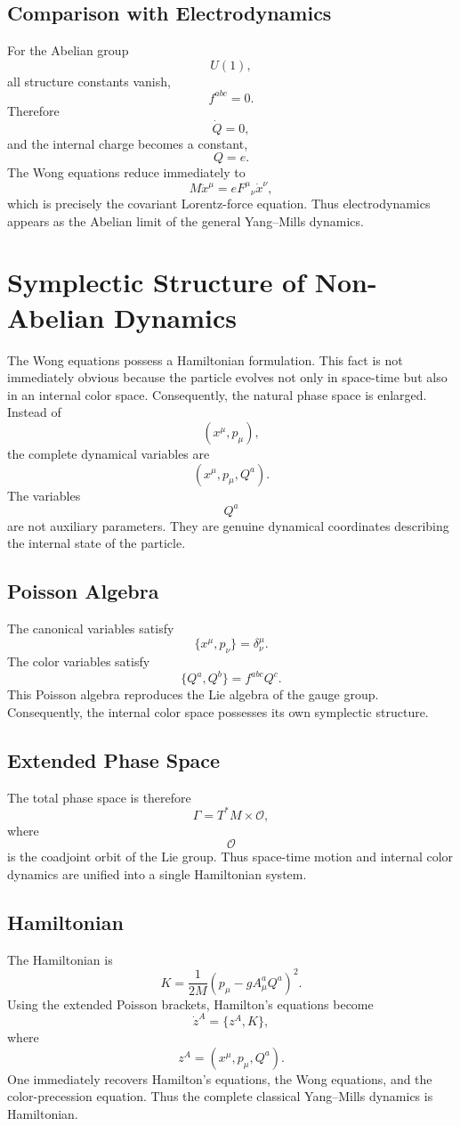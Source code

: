 \subsection{Comparison with Electrodynamics}
For the Abelian group
\[U(1),\]
all structure constants vanish,
\[f^{abc}=0.\]
Therefore
\[\dot Q=0,\]
and the internal charge becomes a constant,
\[Q=e.\]
The Wong equations reduce immediately to
\[M\ddot x^\mu=eF^{\mu}{}_{\nu}\dot x^\nu,\]
which is precisely the covariant Lorentz-force equation.
Thus electrodynamics appears as the Abelian limit of the general
Yang--Mills dynamics.
\section{Symplectic Structure of Non-Abelian Dynamics}
The Wong equations possess a Hamiltonian formulation.
This fact is not immediately obvious because the particle evolves not
only in space-time but also in an internal color space.
Consequently,
the natural phase space is enlarged.
Instead of
\[(x^\mu,p_\mu),\]
the complete dynamical variables are
\[\boxed{(x^\mu,p_\mu,Q^a).}\]
The variables
\[Q^a\]
are not auxiliary parameters.
They are genuine dynamical coordinates describing the internal state of
the particle.
\subsection{Poisson Algebra}
The canonical variables satisfy
\[\{x^\mu,p_\nu\}=\delta^\mu_\nu .\]
The color variables satisfy
\[\boxed{\{Q^a,Q^b\}=f^{abc}Q^c.}\]
This Poisson algebra reproduces the Lie algebra of the gauge group.
Consequently,
the internal color space possesses its own symplectic structure.
\subsection{Extended Phase Space}
The total phase space is therefore
\[\boxed{\Gamma=T^*M\times\mathcal O,}\]
where
\[\mathcal O\]
is the coadjoint orbit of the Lie group.
Thus space-time motion and internal color dynamics
are unified into a single Hamiltonian system.
\subsection{Hamiltonian}
The Hamiltonian is
\[\boxed{K=\frac1{2M}(p_\mu-gA_\mu^aQ^a)^2.}\]
Using the extended Poisson brackets,
Hamilton's equations become
\[\dot z^A=\{z^A,K\},\]
where
\[z^A=(x^\mu,p_\mu,Q^a).\]
One immediately recovers
Hamilton's equations,
the Wong equations,
and the color-precession equation.
Thus the complete classical Yang--Mills dynamics is Hamiltonian.
